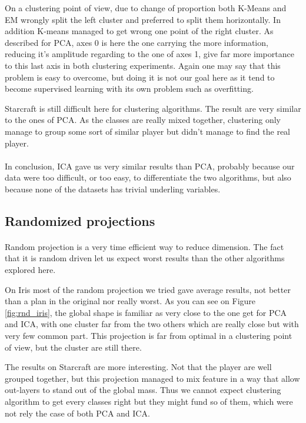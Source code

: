 \documentclass[twocolumn,a4paper,10pt]{article}
\begin{document}
On a clustering point of view, due to change of proportion both K-Means
and EM wrongly split the left cluster and preferred to split them
horizontally. In addition K-means managed to get wrong one point of
the right cluster. As described for PCA, axes 0 is here the one carrying
the more information, reducing it's amplitude regarding to the one
of axes 1, give far more importance to this last axis in both clustering
experiments. Again one may say that this problem is easy to overcome,
but doing it is not our goal here as it tend to become supervised
learning with its own problem such as overfitting.

Starcraft is still difficult here for clustering algorithms. The result
are very similar to the ones of PCA. As the classes are really mixed
together, clustering only manage to group some sort of similar player
but didn't manage to find the real player.

\paragraph{}

In conclusion, ICA gave us very similar results than PCA, probably
because our data were too difficult, or too easy, to differentiate
the two algorithms, but also because none of the datasets has trivial
underling variables.

\subsection{Randomized projections}

\paragraph{}

Random projection is a very time efficient way to reduce dimension.
The fact that it is random driven let us expect worst results than
the other algorithms explored here.

On Iris most of the random projection we tried gave average results,
not better than a plan in the original nor really worst. As you can
see on Figure \ref{fig:rnd_iris}, the global shape is familiar as
very close to the one get for PCA and ICA, with one cluster far from
the two others which are really close but with very few common part.
This projection is far from optimal in a clustering point of view,
but the cluster are still there.

The results on Starcraft are more interesting. Not that the player
are well grouped together, but this projection managed to mix feature
in a way that allow out-layers to stand out of the global mass. Thus
we cannot expect clustering algorithm to get every classes right but
they might fund so of them, which were not rely the case of both PCA
and ICA.
\end{document}
